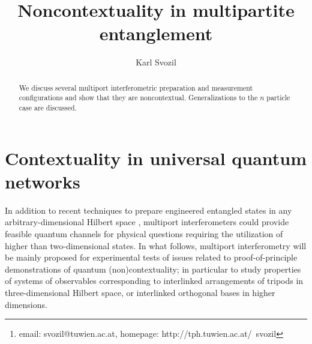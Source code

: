 \documentclass[12pt]{iopart}
\begin{document}
\title{Noncontextuality in multipartite entanglement}

\author{Karl Svozil}
\address{Institut f\"ur Theoretische Physik, University of Technology Vienna,
Wiedner Hauptstra\ss e 8-10/136, A-1040 Vienna, Austria
\footnote{email: svozil@tuwien.ac.at, homepage: http://tph.tuwien.ac.at/~svozil}}


\begin{abstract}
We discuss several multiport interferometric preparation and measurement configurations
and show that they are noncontextual.
Generalizations to the $n$ particle case are discussed.
\end{abstract}

\submitto{\JPA}

\maketitle

\section{Contextuality in universal quantum networks}

In addition to recent techniques to prepare engineered entangled
states in any arbitrary-dimensional Hilbert space
\cite{mvwz-2001,vwz-2002,gisin-2002-d,tdtm-2003},
multiport interferometers could provide feasible quantum channels for physical questions
requiring the utilization of higher than two-dimensional states.
In what follows, multiport interferometry will be mainly proposed for experimental tests of
issues related to proof-of-principle demonstrations of quantum (non)contextuality;
in particular to study properties of systems of observables
corresponding to interlinked arrangements of tripods in three-dimensional Hilbert space,
or interlinked orthogonal bases in higher dimensions.
\end{document}
